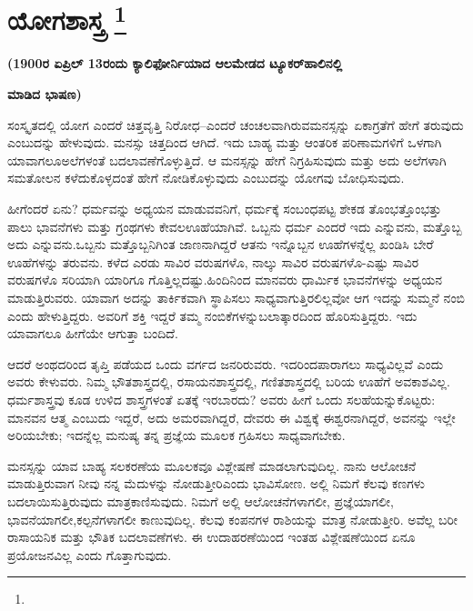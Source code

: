 
\vspace{-0.8cm}

\chapter[ಯೋಗಶಾಸ್ತ್ರ ]{ಯೋಗಶಾಸ್ತ್ರ \protect\footnote{}}

\centerline{\textbf{(1900ರ ಏಪ್ರಿಲ್​ 13ರಂದು ಕ್ಯಾಲಿಫೋರ್ನಿಯಾದ ಆಲಮೇಡದ ಟ್ಯೂಕರ್​ ಹಾಲಿನಲ್ಲಿ}}

\centerline{\textbf{ಮಾಡಿದ ಭಾಷಣ)}}

ಸಂಸ್ಕೃತದಲ್ಲಿ ಯೋಗ ಎಂದರೆ ಚಿತ್ತವೃತ್ತಿ ನಿರೋಧ–ಎಂದರೆ ಚಂಚಲವಾಗಿರುವ\break ಮನಸ್ಸನ್ನು ಏಕಾಗ್ರತೆಗೆ ಹೇಗೆ ತರುವುದು ಎಂಬುದನ್ನು ಹೇಳುವುದು. ಮನಸ್ಸು ಚಿತ್ತದಿಂದ ಆಗಿದೆ. ಇದು ಬಾಹ್ಯ ಮತ್ತು ಆಂತರಿಕ ಪರಿಣಾಮಗಳಿಗೆ ಒಳಗಾಗಿ ಯಾವಾಗಲೂ\break ಅಲೆಗಳಂತೆ ಬದಲಾವಣೆಗೊಳ್ಳುತ್ತಿದೆ. ಆ ಮನಸ್ಸನ್ನು ಹೇಗೆ ನಿಗ್ರಹಿಸುವುದು ಮತ್ತು ಅದು ಅಲೆಗಳಾಗಿ ಸಮತೋಲನ ಕಳೆದುಕೊಳ್ಳದಂತೆ ಹೇಗೆ ನೋಡಿಕೊಳ್ಳುವುದು ಎಂಬುದನ್ನು ಯೋಗವು ಬೋಧಿಸುವುದು.

ಹೀಗೆಂದರೆ ಏನು? ಧರ್ಮವನ್ನು ಅಧ್ಯಯನ ಮಾಡುವವನಿಗೆ, ಧರ್ಮಕ್ಕೆ ಸಂಬಂಧಪಟ್ಟ ಶೇಕಡ ತೊಂಭತ್ತೊಂಭತ್ತು ಪಾಲು ಭಾವನೆಗಳು ಮತ್ತು ಗ್ರಂಥಗಳು ಕೇವಲ\break ಊಹೆಯಾಗಿವೆ. ಒಬ್ಬನು ಧರ್ಮ ಎಂದರೆ ಇದು ಎನ್ನುವನು, ಮತ್ತೊಬ್ಬ ಅದು ಎನ್ನುವನು.\break ಒಬ್ಬನು ಮತ್ತೊಬ್ಬನಿಗಿಂತ ಜಾಣನಾಗಿದ್ದರೆ ಆತನು ಇನ್ನೊಬ್ಬನ ಊಹೆಗಳನ್ನೆಲ್ಲ ಖಂಡಿಸಿ ಬೇರೆ ಊಹೆಗಳನ್ನು ತರುವನು. ಕಳೆದ ಎರಡು ಸಾವಿರ ವರುಷಗಳೊ, ನಾಲ್ಕು ಸಾವಿರ ವರುಷಗಳೊ-ಎಷ್ಟು ಸಾವಿರ ವರುಷಗಳೊ ಸರಿಯಾಗಿ ಯಾರಿಗೂ ಗೊತ್ತಿಲ್ಲದಷ್ಟು.\break ಹಿಂದಿನಿಂದ ಮಾನವರು ಧಾರ್ಮಿಕ ಭಾವನೆಗಳನ್ನು ಅಧ್ಯಯನ ಮಾಡುತ್ತಿರುವರು. ಯಾವಾಗ ಅದನ್ನು ತಾರ್ಕಿಕವಾಗಿ ಸ್ಥಾಪಿಸಲು ಸಾಧ್ಯವಾಗುತ್ತಿರಲಿಲ್ಲವೋ ಆಗ ಇದನ್ನು ಸುಮ್ಮನೆ ನಂಬಿ ಎಂದು ಹೇಳುತ್ತಿದ್ದರು. ಅವರಿಗೆ ಶಕ್ತಿ ಇದ್ದರೆ ತಮ್ಮ ನಂಬಿಕೆಗಳನ್ನು\break ಬಲಾತ್ಕಾರದಿಂದ ಹೊರಿಸುತ್ತಿದ್ದರು. ಇದು ಯಾವಾಗಲೂ ಹೀಗೆಯೇ ಆಗುತ್ತಾ ಬಂದಿದೆ.

\vskip 5pt

ಆದರೆ ಅಂಥದರಿಂದ ತೃಪ್ತಿ ಪಡೆಯದ ಒಂದು ವರ್ಗದ ಜನರಿರುವರು. ಇದರಿಂದ\break ಪಾರಾಗಲು ಸಾಧ್ಯವಿಲ್ಲವೆ ಎಂದು ಅವರು ಕೇಳುವರು. ನಿಮ್ಮ ಭೌತಶಾಸ್ತ್ರದಲ್ಲಿ, ರಸಾಯನ\break ಶಾಸ್ತ್ರದಲ್ಲಿ, ಗಣಿತಶಾಸ್ತ್ರದಲ್ಲಿ ಬರಿಯ ಊಹೆಗೆ ಅವಕಾಶವಿಲ್ಲ. ಧರ್ಮಶಾಸ್ತ್ರವು ಕೂಡ ಉಳಿದ ಶಾಸ್ತ್ರಗಳಂತೆ ಏತಕ್ಕೆ ಇರಬಾರದು? ಅವರು ಹೀಗೆ ಒಂದು ಸಲಹೆಯನ್ನು\break ಕೊಟ್ಟರು: ಮಾನವನ ಆತ್ಮ ಎಂಬುದು ಇದ್ದರೆ, ಅದು ಅಮರವಾಗಿದ್ದರೆ, ದೇವರು ಈ ವಿಶ್ವಕ್ಕೆ ಈಶ್ವರನಾಗಿದ್ದರೆ, ಅವನನ್ನು ಇಲ್ಲೇ ಅರಿಯಬೇಕು; ಇದನ್ನೆಲ್ಲ ಮನುಷ್ಯ ತನ್ನ ಪ್ರಜ್ಞೆಯ ಮೂಲಕ ಗ್ರಹಿಸಲು ಸಾಧ್ಯವಾಗಬೇಕು.

\vskip 3pt

ಮನಸ್ಸನ್ನು ಯಾವ ಬಾಹ್ಯ ಸಲಕರಣೆಯ ಮೂಲಕವೂ ವಿಶ್ಲೇಷಣೆ ಮಾಡಲಾಗುವುದಿಲ್ಲ. ನಾನು ಆಲೋಚನೆ ಮಾಡುತ್ತಿರುವಾಗ ನೀವು ನನ್ನ ಮೆದುಳನ್ನು ನೋಡುತ್ತೀರಿ\break ಎಂದು ಭಾವಿಸೋಣ. ಅಲ್ಲಿ ನಿಮಗೆ ಕೆಲವು ಕಣಗಳು ಬದಲಾಯಿಸುತ್ತಿರುವುದು ಮಾತ್ರ\break ಕಾಣಿಸುವುದು. ನಿಮಗೆ ಅಲ್ಲಿ ಆಲೋಚನೆಗಳಾಗಲೀ, ಪ್ರಜ್ಞೆಯಾಗಲೀ, ಭಾವನೆಯಾಗಲೀ,\break ಕಲ್ಪನೆಗಳಾಗಲೀ ಕಾಣುವುದಿಲ್ಲ. ಕೆಲವು ಕಂಪನಗಳ ರಾಶಿಯನ್ನು ಮಾತ್ರ ನೋಡುತ್ತೀರಿ. ಅವೆಲ್ಲ ಬರೀ ರಾಸಾಯನಿಕ ಮತ್ತು ಭೌತಿಕ ಬದಲಾವಣೆಗಳು. ಈ ಉದಾಹರಣೆಯಿಂದ ಇಂತಹ ವಿಶ್ಲೇಷಣೆಯಿಂದ ಏನೂ ಪ್ರಯೋಜನವಿಲ್ಲ ಎಂದು ಗೊತ್ತಾಗುವುದು.

